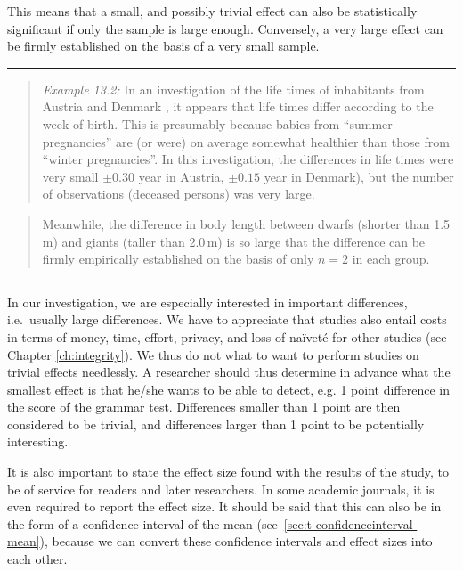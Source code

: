 \documentclass[
]{book}
\begin{document}
This means
that a small, and possibly trivial effect can also be
statistically significant if only the sample is large enough.
Conversely, a very large effect can be firmly established on the basis of
a very small sample.

\begin{center}\rule{0.5\linewidth}{0.5pt}\end{center}

\begin{quote}
\emph{Example 13.2:}
In an investigation of the life times of inhabitants from Austria
and Denmark \citep{Dobl99}, it appears that life times differ according to
the week of birth. This is presumably because babies from ``summer pregnancies''
are (or were) on average somewhat healthier than those
from ``winter pregnancies''. In this investigation, the differences
in life times were very small \(\pm 0.30\) year in Austria, \(\pm 0.15\) year
in Denmark), but the number of observations (deceased persons) was very large.
\end{quote}

\begin{quote}
Meanwhile, the difference in body length between dwarfs (shorter than
1.5 m) and giants (taller than 2.0 m) is so large that the difference can be firmly
empirically established on the basis of only \(n=2\) in each group.
\end{quote}

\begin{center}\rule{0.5\linewidth}{0.5pt}\end{center}

In our investigation, we are especially interested in important
differences, i.e.~usually large differences. We have to appreciate
that studies also entail costs in terms of money, time,
effort, privacy, and loss of naïveté for other studies
(see Chapter
\ref{ch:integrity}). We thus do not what to want to perform studies
on trivial effects needlessly. A researcher should thus determine in advance
what the smallest effect is that he/she wants to be able to detect, e.g.
1 point difference in the score of the grammar test. Differences smaller than
1 point are then considered to be trivial, and differences larger than 1 point to be potentially
interesting.

It is also important to state the effect size found with the results
of the study, to be of service for readers and later
researchers. In some academic journals, it is even
required to report the effect size. It should be said that this
can also be in the form of a confidence interval of the mean
(see~\ref{sec:t-confidenceinterval-mean}), because we can
convert these confidence intervals and effect sizes into
each other.
\end{document}
